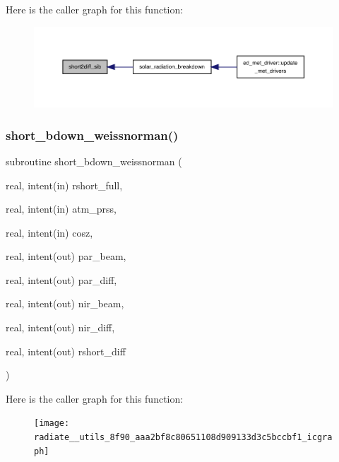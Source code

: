Here is the caller graph for this function\+:
\nopagebreak
\begin{figure}[H]
\begin{center}
\leavevmode
\includegraphics[width=350pt]{radiate__utils_8f90_a51dd2852d7a8314141edfffde24dd0af_icgraph}
\end{center}
\end{figure}
\mbox{\label{radiate__utils_8f90_aaa2bf8c80651108d909133d3c5bccbf1}} 
\subsubsection{\texorpdfstring{short\+\_\+bdown\+\_\+weissnorman()}{short\_bdown\_weissnorman()}}
{\footnotesize\ttfamily subroutine short\+\_\+bdown\+\_\+weissnorman (\begin{DoxyParamCaption}\item[{real, intent(in)}]{rshort\+\_\+full,  }\item[{real, intent(in)}]{atm\+\_\+prss,  }\item[{real, intent(in)}]{cosz,  }\item[{real, intent(out)}]{par\+\_\+beam,  }\item[{real, intent(out)}]{par\+\_\+diff,  }\item[{real, intent(out)}]{nir\+\_\+beam,  }\item[{real, intent(out)}]{nir\+\_\+diff,  }\item[{real, intent(out)}]{rshort\+\_\+diff }\end{DoxyParamCaption})}

Here is the caller graph for this function\+:
\nopagebreak
\begin{figure}[H]
\begin{center}
\leavevmode
\texttt{[image: radiate\_\_utils\_8f90\_aaa2bf8c80651108d909133d3c5bccbf1\_icgraph]}
\end{center}
\end{figure}
\mbox{\label{radiate__utils_8f90_a672952348e79808e2b0f947194522dce}} 
